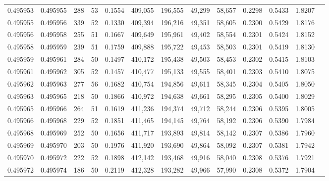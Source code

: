 \begin{tabular}{rrrrrrrrrrrrr}
0.495953 & 0.495955 &   288 &  53 &                                     0.1554 & 409,055 & 196,555 &  49,299 &  58,657 & 0.2298 & 0.5433 & 1.8207 \\
0.495955 & 0.495956 &   339 &  52 &                                     0.1330 & 409,394 & 196,216 &  49,351 &  58,605 & 0.2300 & 0.5429 & 1.8176 \\
0.495956 & 0.495958 &   255 &  51 &                                     0.1667 & 409,649 & 195,961 &  49,402 &  58,554 & 0.2301 & 0.5424 & 1.8152 \\
0.495958 & 0.495959 &   239 &  51 &                                     0.1759 & 409,888 & 195,722 &  49,453 &  58,503 & 0.2301 & 0.5419 & 1.8130 \\
0.495959 & 0.495961 &   284 &  50 &                                     0.1497 & 410,172 & 195,438 &  49,503 &  58,453 & 0.2302 & 0.5415 & 1.8103 \\
0.495961 & 0.495962 &   305 &  52 &                                     0.1457 & 410,477 & 195,133 &  49,555 &  58,401 & 0.2303 & 0.5410 & 1.8075 \\
0.495962 & 0.495963 &   277 &  56 &                                     0.1682 & 410,754 & 194,856 &  49,611 &  58,345 & 0.2304 & 0.5405 & 1.8050 \\
0.495963 & 0.495965 &   218 &  50 &                                     0.1866 & 410,972 & 194,638 &  49,661 &  58,295 & 0.2305 & 0.5400 & 1.8029 \\
0.495965 & 0.495966 &   264 &  51 &                                     0.1619 & 411,236 & 194,374 &  49,712 &  58,244 & 0.2306 & 0.5395 & 1.8005 \\
0.495966 & 0.495968 &   229 &  52 &                                     0.1851 & 411,465 & 194,145 &  49,764 &  58,192 & 0.2306 & 0.5390 & 1.7984 \\
0.495968 & 0.495969 &   252 &  50 &                                     0.1656 & 411,717 & 193,893 &  49,814 &  58,142 & 0.2307 & 0.5386 & 1.7960 \\
0.495969 & 0.495970 &   203 &  50 &                                     0.1976 & 411,920 & 193,690 &  49,864 &  58,092 & 0.2307 & 0.5381 & 1.7942 \\
0.495970 & 0.495972 &   222 &  52 &                                     0.1898 & 412,142 & 193,468 &  49,916 &  58,040 & 0.2308 & 0.5376 & 1.7921 \\
0.495972 & 0.495974 &   186 &  50 &                                     0.2119 & 412,328 & 193,282 &  49,966 &  57,990 & 0.2308 & 0.5372 & 1.7904 \\

\end{tabular}
